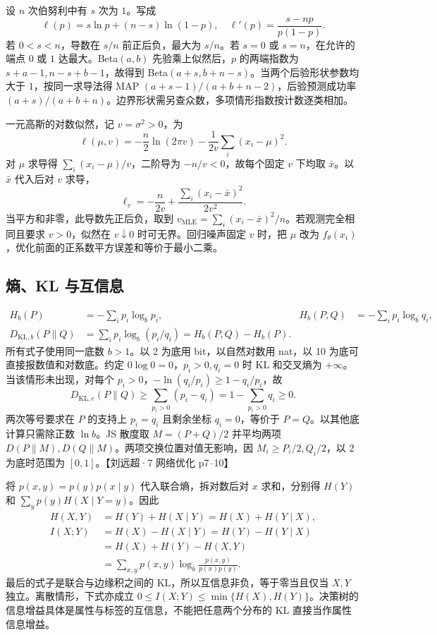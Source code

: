 \documentclass[UTF8,a4paper,zihao=-4,fontset=fandol]{ctexrep}
\begin{document}
设 \(n\) 次伯努利中有 \(s\) 次为 \(1\)。写成
\[
 \ell(p)=s\ln p+(n-s)\ln(1-p),\quad
 \ell'(p)=\frac{s-np}{p(1-p)}.
\]
若 \(0<s<n\)，导数在 \(s/n\) 前正后负，最大为 \(s/n\)。若 \(s=0\) 或 \(s=n\)，在允许的端点 \(0\) 或 \(1\) 达最大。Beta\((a,b)\) 先验乘上似然后，\(p\) 的两端指数为 \(s+a-1,n-s+b-1\)，故得到 Beta\((a+s,b+n-s)\)。当两个后验形状参数均大于 \(1\)，按同一求导法得 MAP \((a+s-1)/(a+b+n-2)\)，后验预测成功率 \((a+s)/(a+b+n)\)。边界形状需另查众数，多项情形指数按计数逐类相加。

一元高斯的对数似然，记 \(v=\sigma^2>0\)，为
\[
 \ell(\mu,v)=-\frac n2\ln(2\pi v)-\frac1{2v}\sum_i(x_i-\mu)^2 .
\]
对 \(\mu\) 求导得 \(\sum_i(x_i-\mu)/v\)，二阶导为 \(-n/v<0\)，故每个固定 \(v\) 下均取 \(\bar x\)。以 \(\bar x\) 代入后对 \(v\) 求导，
\[
 \ell_v=-\frac n{2v}+\frac{\sum_i(x_i-\bar x)^2}{2v^2}.
\]
当平方和非零，此导数先正后负，取到 \(v_{\mathrm{MLE}}=\sum_i(x_i-\bar x)^2/n\)。若观测完全相同且要求 \(v>0\)，似然在 \(v\downarrow0\) 时可无界。回归噪声固定 \(v\) 时，把 \(\mu\) 改为 \(f_\theta(x_i)\)，优化前面的正系数平方误差和等价于最小二乘。

\subsection*{熵、KL 与互信息}
\[
 \begin{aligned}
 H_b(P)&=-\sum_i p_i\log_b p_i,&
 H_b(P,Q)&=-\sum_i p_i\log_b q_i,\\
 D_{\mathrm{KL},b}(P\|Q)
 &=\sum_i p_i\log_b(p_i/q_i)
 =H_b(P,Q)-H_b(P).
 \end{aligned}
\]
所有式子使用同一底数 \(b>1\)。以 2 为底用 bit，以自然对数用 nat，以 10 为底可直接报数值和对数底。约定 \(0\log 0=0\)，\(p_i>0,q_i=0\) 时 KL 和交叉熵为 \(+\infty\)。当该情形未出现，对每个 \(p_i>0\)，\(-\ln(q_i/p_i)\ge 1-q_i/p_i\)，故
\[
 D_{\mathrm{KL},e}(P\|Q)\ge \sum_{p_i>0}(p_i-q_i)=1-\sum_{p_i>0}q_i\ge 0.
\]
两次等号要求在 \(P\) 的支持上 \(p_i=q_i\) 且剩余坐标 \(q_i=0\)，等价于 \(P=Q\)。以其他底计算只需除正数 \(\ln b\)。JS 散度取 \(M=(P+Q)/2\) 并平均两项 \(D(P\|M),D(Q\|M)\)。两项交换位置对值无影响，因 \(M_i\ge P_i/2,Q_i/2\)，以 2 为底时范围为 \([0,1]\)。【刘远超·7 网络优化 p7--10】

将 \(p(x,y)=p(y)p(x\mid y)\) 代入联合熵，拆对数后对 \(x\) 求和，分别得 \(H(Y)\) 和 \(\sum_y p(y)H(X\mid Y=y)\)。因此
\[
 \begin{aligned}
 H(X,Y)&=H(Y)+H(X\mid Y)=H(X)+H(Y\mid X),\\
 I(X;Y)&=H(X)-H(X\mid Y)=H(Y)-H(Y\mid X)\\
 &=H(X)+H(Y)-H(X,Y)\\
 &=\sum_{x,y}p(x,y)\log_b\frac{p(x,y)}{p(x)p(y)}.
 \end{aligned}
\]
最后的式子是联合与边缘积之间的 KL，所以互信息非负，等于零当且仅当 \(X,Y\) 独立。离散情形，下式亦成立 \(0\le I(X;Y)\le\min\{H(X),H(Y)\}\)。决策树的信息增益具体是属性与标签的互信息，不能把任意两个分布的 KL 直接当作属性信息增益。
\end{document}
